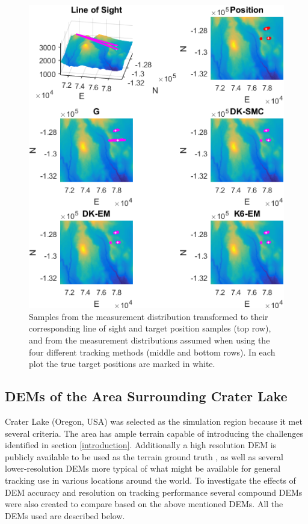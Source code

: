 \documentclass[journal]{IEEEtran}
\begin{document}
\begin{figure}[ht]
    \centering
    \includegraphics[scale=0.7]{sample_frame.png}
    \caption{Samples from the measurement distribution transformed to their corresponding line of sight and target position samples (top row), and from the measurement distributions assumed when using the four different tracking methods (middle and bottom rows). In each plot the true target positions are marked in white.}
    \label{fig:sample_frame}
\end{figure}

\subsection{DEMs of the Area Surrounding Crater Lake}
Crater Lake (Oregon, USA) was selected as the simulation region because it met several criteria. The area has ample terrain capable of introducing the challenges identified in section \ref{introduction}. Additionally a high resolution DEM is publicly available to be used as the terrain ground truth \cite{robinson2012high}, as well as several lower-resolution DEMs \cite{jpl13, nasa00} more typical of what might be available for general tracking use in various locations around the world. To investigate the effects of DEM accuracy and resolution on tracking performance several compound DEMs were also created to compare based on the above mentioned DEMs. All the DEMs used are described below.
\end{document}
